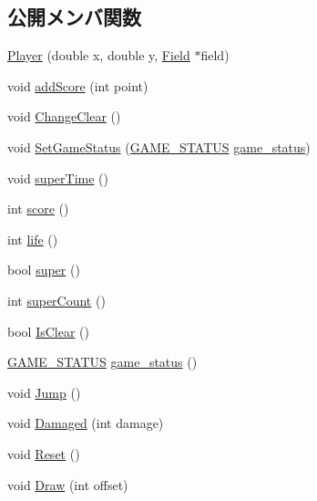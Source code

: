 \subsection*{公開メンバ関数}
\begin{DoxyCompactItemize}
\item 
\hyperlink{class_player_a03542e946924b8084cb2a8af99dc30e5}{Player} (double x, double y, \hyperlink{class_field}{Field} $\ast$field)
\item 
void \hyperlink{class_player_abc93f150c044405d86ebfceb5026b546}{add\+Score} (int point)
\item 
void \hyperlink{class_player_a8fa34b8279dd879ad2b56d3ed77e4963}{Change\+Clear} ()
\item 
void \hyperlink{class_player_a33b2feb64c47c415d4ce2709bac934cc}{Set\+Game\+Status} (\hyperlink{_player_8h_a3f619558ea4f7947c437250166fbd29b}{G\+A\+M\+E\+\_\+\+S\+T\+A\+T\+U\+S} \hyperlink{class_player_a6eaebcae8a2d8e90033ba21ed3065b91}{game\+\_\+status})
\item 
void \hyperlink{class_player_a2e85dba0b04af54c87dd2819b637512b}{super\+Time} ()
\item 
int \hyperlink{class_player_a0b5af9f507f7901efcc8ab8ee85e02a5}{score} ()
\item 
int \hyperlink{class_player_a012e5b3b06efa727a230b0b4d44eeafd}{life} ()
\item 
bool \hyperlink{class_player_abaf0c48bc8bd4a1f04d45821cebc17ea}{super} ()
\item 
int \hyperlink{class_player_ac8f40782910567cac2a45bc12bd668b5}{super\+Count} ()
\item 
bool \hyperlink{class_player_aa620c2ad442cf120fab24bee89006050}{Is\+Clear} ()
\item 
\hyperlink{_player_8h_a3f619558ea4f7947c437250166fbd29b}{G\+A\+M\+E\+\_\+\+S\+T\+A\+T\+U\+S} \hyperlink{class_player_a6eaebcae8a2d8e90033ba21ed3065b91}{game\+\_\+status} ()
\item 
void \hyperlink{class_player_a1334990b8b7aaaad904e22f03f4d947d}{Jump} ()
\item 
void \hyperlink{class_player_ab60f92a8070d5522ffaf30dbc8224a36}{Damaged} (int damage)
\item 
void \hyperlink{class_player_a22a0d2b901622c497b677b7c75fafe45}{Reset} ()
\item 
void \hyperlink{class_player_a5e32dec9258cfa8145e482fed4c42c83}{Draw} (int offset)
\end{DoxyCompactItemize}
